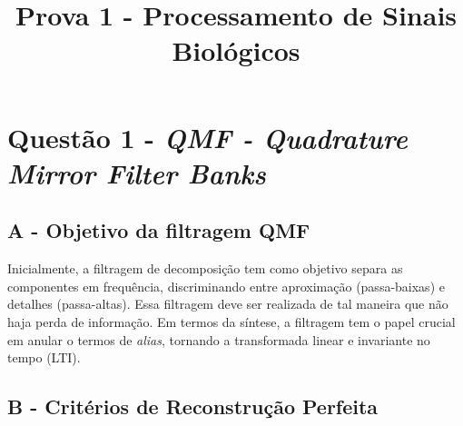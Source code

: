 \documentclass{article}
\title{Prova 1 - Processamento de Sinais Biológicos}
\begin{document}
\onecolumn
\maketitle

\section*{Questão 1 - \textit{QMF - Quadrature Mirror Filter Banks}}
\subsection*{A - Objetivo da filtragem QMF}
Inicialmente, a filtragem de decomposição tem como objetivo separa as componentes em frequência, discriminando entre aproximação (passa-baixas) e detalhes (passa-altas). Essa filtragem deve ser realizada de tal maneira que não haja perda de informação. Em termos da síntese, a filtragem tem o papel crucial em anular o termos de \textit{alias}, tornando a transformada linear e invariante no tempo (LTI).

\subsection*{B - Critérios de Reconstrução Perfeita}
\end{document}
